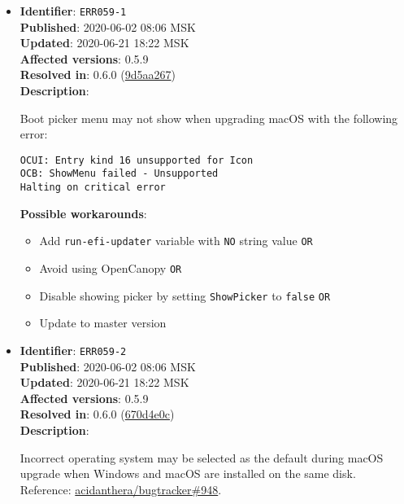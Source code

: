 \documentclass[]{article}
\providecommand{\tightlist}{%
  \setlength{\itemsep}{0pt}\setlength{\parskip}{0pt}}
\begin{document}
\begin{itemize}
\item
  \textbf{Identifier}: \texttt{ERR059-1} \\
  \textbf{Published}: 2020-06-02 08:06 MSK \\
  \textbf{Updated}: 2020-06-21 18:22 MSK \\
  \textbf{Affected versions}: 0.5.9 \\
  \textbf{Resolved in}: 0.6.0 (\href{https://github.com/acidanthera/OpenCorePkg/commit/9d5aa267a9133fd9390b62012c21428fc77681f2}{9d5aa267}) \\
  \textbf{Description}:

  Boot picker menu may not show when upgrading macOS with the following error:

\texttt{OCUI﻿: Ent﻿ry kind 16 unsupported for Icon﻿}\\
\texttt{OCB: ShowMenu failed - Unsupported﻿﻿}\\
\texttt{Halting on critical error﻿}

  \textbf{Possible workarounds}:
  \begin{itemize}
    \tightlist
    \item Add \texttt{run-efi-updater} variable with \texttt{NO} string value \texttt{OR}
    \item Avoid using OpenCanopy \texttt{OR}
    \item Disable showing picker by setting \texttt{ShowPicker} to \texttt{false} \texttt{OR}
    \item Update to master version
  \end{itemize}


\item
  \textbf{Identifier}: \texttt{ERR059-2} \\
  \textbf{Published}: 2020-06-02 08:06 MSK \\
  \textbf{Updated}: 2020-06-21 18:22 MSK \\
  \textbf{Affected versions}: 0.5.9 \\
  \textbf{Resolved in}: 0.6.0 (\href{https://github.com/acidanthera/OpenCorePkg/commit/670d4e0c4f8538268367d16fc3ddef9b2ed13d46}{670d4e0c}) \\
  \textbf{Description}:

  Incorrect operating system may be selected as the default during macOS upgrade when
  Windows and macOS are installed on the same disk. Reference:
  \href{https://github.com/acidanthera/bugtracker/issues/948}{acidanthera/bugtracker\#948}.


\end{itemize}
\end{document}
